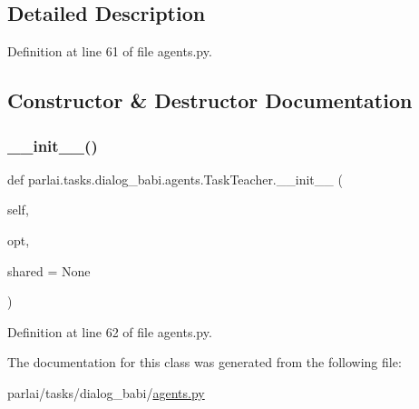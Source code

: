 \subsection{Detailed Description}


Definition at line 61 of file agents.\+py.



\subsection{Constructor \& Destructor Documentation}
\mbox{\label{classparlai_1_1tasks_1_1dialog__babi_1_1agents_1_1TaskTeacher_a04ad8a9d7b96a3115bc3661bb875eeef}} 
\subsubsection{\texorpdfstring{\+\_\+\+\_\+init\+\_\+\+\_\+()}{\_\_init\_\_()}}
{\footnotesize\ttfamily def parlai.\+tasks.\+dialog\+\_\+babi.\+agents.\+Task\+Teacher.\+\_\+\+\_\+init\+\_\+\+\_\+ (\begin{DoxyParamCaption}\item[{}]{self,  }\item[{}]{opt,  }\item[{}]{shared = {\ttfamily None} }\end{DoxyParamCaption})}



Definition at line 62 of file agents.\+py.



The documentation for this class was generated from the following file\+:\begin{DoxyCompactItemize}
\item 
parlai/tasks/dialog\+\_\+babi/\hyperlink{parlai_2tasks_2dialog__babi_2agents_8py}{agents.\+py}\end{DoxyCompactItemize}
